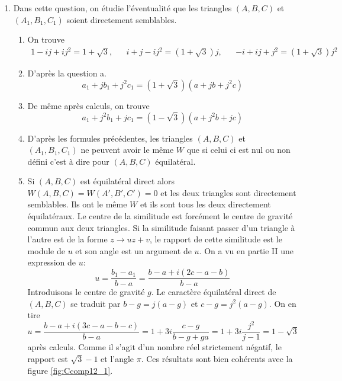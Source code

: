 \begin{enumerate}
 \item Dans cette question, on étudie l'éventualité que les triangles $(A,B,C)$ et $(A_1,B_1,C_1)$ soient directement semblables.
\begin{enumerate}
 \item On trouve
\begin{align*}
 1-ij+ij^2 = 1+\sqrt{3}, & &
 i+j-ij^2 = (1+\sqrt{3})j, & &
 -i+ij+j^2 = (1+\sqrt{3})j^2
\end{align*}

 \item D'après la question a.
\begin{displaymath}
 a_1+jb_1+j^2c_1 = (1+\sqrt{3})(a+jb+j^2c)
\end{displaymath}

 \item De même après calculs, on trouve
\begin{displaymath}
 a_1+j^2b_1+jc_1 = (1-\sqrt{3})(a+j^2b+jc)
\end{displaymath}

 \item D'après les formules précédentes, les triangles $(A,B,C)$ et $(A_1,B_1,C_1)$ ne peuvent avoir le même $W$ que si celui ci est nul ou non défini c'est à dire pour $(A,B,C)$ équilatéral.
 \item  Si $(A,B,C)$ est équilatéral direct alors $W(A,B,C)=W(A',B',C')=0$ et les deux triangles sont directement semblables. Ils ont le même $W$ et ils sont tous les deux directement équilatéraux.\newline
Le centre de la similitude est forcément le centre de gravité commun aux deux triangles. Si la similitude faisant passer d'un triangle à l'autre est de la forme $z\rightarrow uz+v$, le rapport de cette similitude est le module de $u$ et son angle est un argument de $u$.\newline
On a vu en partie II une expression de $u$:
\begin{displaymath}
 u = \frac{b_1-a_1}{b-a}=\frac{b-a + i(2c-a-b)}{b-a}
\end{displaymath}
Introduisons le centre de gravité $g$. Le caractère équilatéral direct de $(A,B,C)$ se traduit par $b-g = j(a-g)$ et $c-g=j^2(a-g)$. On en tire
\begin{displaymath}
 u= \frac{b-a + i(3c-a-b-c)}{b-a}= 1 +3i\frac{c-g}{b-g+ga}=1+3i\frac{j^2}{j-1}=1-\sqrt{3}
\end{displaymath}
après calculs. Comme il s'agit d'un nombre réel strictement négatif,  le rapport est $\sqrt{3}-1$ et l'angle $\pi$. Ces résultats sont bien cohérents avec la figure \ref{fig:Ccomp12_1}.
\end{enumerate}

\end{enumerate}

